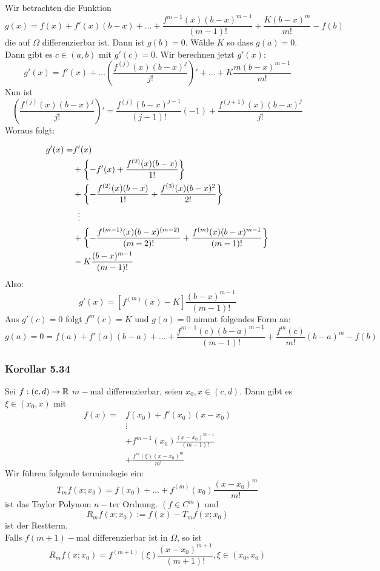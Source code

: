 \begin{beweis}{}
Wir betrachten die Funktion 
\[g(x)=f(x)+f'(x)(b-x)+\dots+\frac{f^{m-1}(x)(b-x)^{m-1}}{(m-1)!}+\frac{K(b-x)^m}{m!}-f(b)\]
die auf $\Omega$ differenzierbar ist. Dann ist $g(b)=0$. Wähle $K$ so dass $g(a)=0$. Dann gibt es $c\in (a,b)$ mit $g'(c)=0$. Wir berechnen jetzt $g'(x)$:
\[g'(x)=f'(x)+\dots \left( \frac{f^{(j)}(x)(b-x)^j}{j!}\right)'+\dots+K\frac{m(b-x)^{m-1}}{m!}\]
Nun ist
\[\left( \frac{f^{(j)}(x)(b-x)^j}{j!}\right)'=\frac{f^{(j)}(b-x)^{j-1}}{(j-1)!}(-1)+\frac{f^{(j+1)}(x)(b-x)^{j}}{j!}\]
Woraus folgt:

\begin{align*}
g'(x)=&f'(x)\\
&+\left\{ -f'(x)+\frac{f^{(2)}{(x)(b-x)}}{1!}\right\}\\
&+\left\{ -\frac{f^{(2)}(x)(b-x)}{1!}+ \frac{f^{(3)}(x)(b-x)^2}{2!} \right\}\\
&\hspace{2mm}\vdots\\
&+\left\{ -\frac{f^{(m-1)}(x)(b-x)^{(m-2)}}{(m-2)!}+ \frac{f^{(m)}(x)(b-x)^{m-1}}{(m-1)!} \right\}\\
&-K\frac{(b-x)^{m-1}}{(m-1)!}
\end{align*}
Also: \[g'(x)=\left[ f^{(m)}(x)-K\right]\frac{(b-x)^{m-1}}{(m-1)!}\]
Aus $g'(c)=0$ folgt $\boxed{f^m(c)=K}$ und $g(a)=0$ nimmt folgendes Form an: 
\[g(a)=0=f(a)+f'(a)(b-a)+\dots+\frac{f^{m-1}(c)(b-a)^{m-1}}{(m-1)!}+\frac{f^m(c)}{m!}(b-a)^m-f(b)\]
\end{beweis}

\subsubsection*{Korollar 5.34}
Sei $f:(c,d)\to\mathbb{R}$ $m-$mal differenzierbar, seien $x_0,x\in (c,d)$. Dann gibt es $\xi\in (x_0,x)$ mit 
\begin{align*}
f(x)=&f(x_0)+f'(x_0)(x-x_0)\\
&\vdots \\
&+f^{m-1}(x_0)\frac{(x-x_0)^{m-1}}{(m-1)!}\\
&+\frac{f^m(\xi)(x-x_0)^m}{m!}
\end{align*}
Wir führen folgende terminologie ein: 
\[T_mf(x;x_0) = f(x_0)+\dots+f^{(m)}(x_0)\frac{(x-x_0)^m}{m!}\]
ist das Taylor Polynom $n-$ter Ordnung. $\left( f\in C^m\right)$ und
\[R_mf(x;x_0):=f(x)-T_mf(x;x_0)\]
ist der Restterm. \\

Falls $f(m+1)-$mal differenzierbar ist in $\Omega$, so ist 
\[R_mf(x;x_0)=f^{(m+1)}(\xi)\frac{\left( x-x_0\right)^{m+1}}{(m+1)!}, \xi\in\left( x_0,x_0\right)\]

